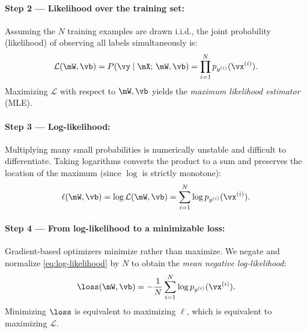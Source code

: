 \documentclass[sigconf,screen,nonacm]{acmart}
\begin{document}
\paragraph{Step 2 --- Likelihood over the training set:}
Assuming the $N$ training examples are drawn i.i.d., the joint probability (likelihood) of observing all labels simultaneously is:
\begin{equation}
    \mathcal{L}(\mW, \vb) = P(\vy \mid \mX;\,\mW,\vb) = \prod_{i=1}^{N} p_{y^{(i)}}(\vx^{(i)}).
    \label{eq:likelihood}
\end{equation}
Maximizing $\mathcal{L}$ with respect to $\mW, \vb$ yields the \emph{maximum likelihood estimator} (MLE).

\paragraph{Step 3 --- Log-likelihood:}
Multiplying many small probabilities is numerically unstable and difficult to differentiate. Taking logarithms converts the product to a sum and preserves the location of the maximum (since $\log$ is strictly monotone):
\begin{equation}
    \ell(\mW, \vb) = \log \mathcal{L}(\mW, \vb) = \sum_{i=1}^{N} \log p_{y^{(i)}}(\vx^{(i)}).
    \label{eq:log-likelihood}
\end{equation}

\paragraph{Step 4 --- From log-likelihood to a minimizable loss:}
Gradient-based optimizers minimize rather than maximize. We negate and normalize \cref{eq:log-likelihood} by $N$ to obtain the \emph{mean negative log-likelihood}:
\begin{equation}
    \loss(\mW, \vb) = -\frac{1}{N}\sum_{i=1}^{N} \log p_{y^{(i)}}(\vx^{(i)}).
    \label{eq:nll}
\end{equation}
Minimizing $\loss$ is equivalent to maximizing $\ell$, which is equivalent to maximizing $\mathcal{L}$.
\end{document}
